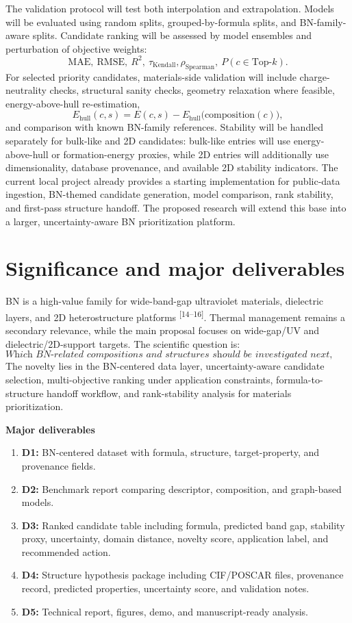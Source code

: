 \documentclass[10pt]{article}
\newcommand{\ehull}{E_{\mathrm{hull}}}
\begin{document}
The validation protocol will test both interpolation and extrapolation. Models will be evaluated using random splits, grouped-by-formula splits, and BN-family-aware splits. Candidate ranking will be assessed by model ensembles and perturbation of objective weights:
\[
  \mathrm{MAE},\ \mathrm{RMSE},\ R^2,\ \tau_{\mathrm{Kendall}},
  \rho_{\mathrm{Spearman}},\ P(c\in\mathrm{Top}\text{-}k).
\]
For selected priority candidates, materials-side validation will include charge-neutrality checks, structural sanity checks, geometry relaxation where feasible, energy-above-hull re-estimation,
\[
  \ehull(c,s)=E(c,s)-E_{\mathrm{hull}}\big(\mathrm{composition}(c)\big),
\]
and comparison with known BN-family references.
Stability will be handled separately for bulk-like and 2D candidates: bulk-like entries will use energy-above-hull or formation-energy proxies, while 2D entries will additionally use dimensionality, database provenance, and available 2D stability indicators.
The current local project already provides a starting implementation for public-data ingestion, BN-themed candidate generation, model comparison, rank stability, and first-pass structure handoff. The proposed research will extend this base into a larger, uncertainty-aware BN prioritization platform.

\section*{Significance and major deliverables}
BN is a high-value family for wide-band-gap ultraviolet materials, dielectric layers, and 2D heterostructure platforms \textsuperscript{[14--16]}. Thermal management remains a secondary relevance, while the main proposal focuses on wide-gap/UV and dielectric/2D-support targets. The scientific question is:
\[
  \textit{Which BN-related compositions and structures should be investigated next, and with what level of uncertainty?}
\]
The novelty lies in the BN-centered data layer, uncertainty-aware candidate selection, multi-objective ranking under application constraints, formula-to-structure handoff workflow, and rank-stability analysis for materials prioritization.

\textbf{Major deliverables}
\begin{enumerate}
  \item \textbf{D1:} BN-centered dataset with formula, structure, target-property, and provenance fields.
  \item \textbf{D2:} Benchmark report comparing descriptor, composition, and graph-based models.
  \item \textbf{D3:} Ranked candidate table including formula, predicted band gap, stability proxy, uncertainty, domain distance, novelty score, application label, and recommended action.
  \item \textbf{D4:} Structure hypothesis package including CIF/POSCAR files, provenance record, predicted properties, uncertainty score, and validation notes.
  \item \textbf{D5:} Technical report, figures, demo, and manuscript-ready analysis.
\end{enumerate}
\end{document}
